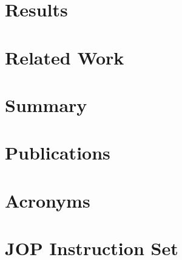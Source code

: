 %    

\chapter{Results}

\label{chap:results}
    

\chapter{Related Work}
\label{chap:related}

    


\chapter{Summary}
\label{chap:conclusions}

    





\appendix
 \ihead{\leftmark} %

\chapter{Publications}
    

\chapter{Acronyms}
 \label{appx:acro}



\chapter{JOP Instruction Set} \label{appx:jop:instr}


